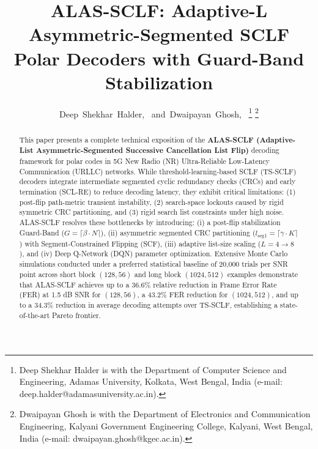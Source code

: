 \documentclass[journal,10pt,twocolumn]{IEEEtran}
\begin{document}
\title{ALAS-SCLF: Adaptive-L Asymmetric-Segmented SCLF Polar Decoders with Guard-Band Stabilization}

\author{Deep~Shekhar~Halder,~
        and~Dwaipayan~Ghosh,~%
\thanks{Deep Shekhar Halder is with the Department of Computer Science and Engineering, Adamas University, Kolkata, West Bengal, India (e-mail: deep.halder@adamasuniversity.ac.in).}%
\thanks{Dwaipayan Ghosh is with the Department of Electronics and Communication Engineering, Kalyani Government Engineering College, Kalyani, West Bengal, India (e-mail: dwaipayan.ghosh@kgec.ac.in).}}

\maketitle

\begin{abstract}
This paper presents a complete technical exposition of the \textbf{ALAS-SCLF (Adaptive-List Asymmetric-Segmented Successive Cancellation List Flip)} decoding framework for polar codes in 5G New Radio (NR) Ultra-Reliable Low-Latency Communication (URLLC) networks. While threshold-learning-based SCLF (TS-SCLF) decoders integrate intermediate segmented cyclic redundancy checks (CRCs) and early termination (SCL-RE) to reduce decoding latency, they exhibit critical limitations: (1) post-flip path-metric transient instability, (2) search-space lockouts caused by rigid symmetric CRC partitioning, and (3) rigid search list constraints under high noise. ALAS-SCLF resolves these bottlenecks by introducing: (i) a post-flip stabilization Guard-Band ($G = \lceil \beta \cdot N \rceil$), (ii) asymmetric segmented CRC partitioning ($l_{\text{seg1}} = \lceil \gamma \cdot K \rceil$) with Segment-Constrained Flipping (SCF), (iii) adaptive list-size scaling ($L = 4 \rightarrow 8$), and (iv) Deep Q-Network (DQN) parameter optimization. Extensive Monte Carlo simulations conducted under a preferred statistical baseline of 20,000 trials per SNR point across short block $(128, 56)$ and long block $(1024, 512)$ examples demonstrate that ALAS-SCLF achieves up to a 36.6\% relative reduction in Frame Error Rate (FER) at 1.5 dB SNR for $(128, 56)$, a 43.2\% FER reduction for $(1024, 512)$, and up to a 34.3\% reduction in average decoding attempts over TS-SCLF, establishing a state-of-the-art Pareto frontier.
\end{abstract}
\end{document}
